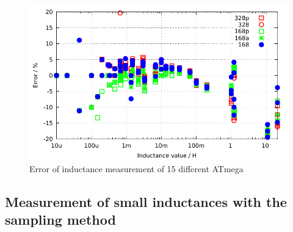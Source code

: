 \begin{figure}[H]
\centering
\includegraphics[width=1.\textwidth]{../GNU/induct328p.pdf}
\caption{Error of inductance measurement of 15 different ATmega}
\label{fig:Induct328p}
\end{figure}

\subsection{Measurement of small inductances with the sampling method}

